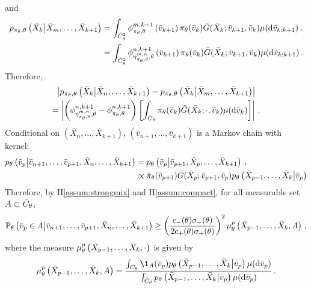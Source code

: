 and 
\begin{align*}
p_{\pi_{\theta},\theta}\left(\bar X_{k}\middle| \bar X_{m},\ldots,\bar X_{k+1}\right) &= \int_{\bar C_{\theta}^2}\phi^{m,k+1}_{\pi_{\theta},\theta}\left(\bar v_{k+1}\right)\pi_{\theta}(\bar v_{k})\bar G(\bar X_{k};\bar v_{k+1},\bar v_{k})\mu(\mathrm{d} \bar v_{k:k+1})\,,\\
&=\int_{\bar C_{\theta}^2}\phi^{n,k+1}_{\eta^{m,n}_{\pi_{\theta},\theta},\theta}\left(\bar v_{k+1}\right)\pi_{\theta}(\bar v_{k})\bar G(\bar X_{k};\bar v_{k+1},\bar v_{k})\mu(\mathrm{d} \bar v_{k:k+1})\,.
\end{align*}
Therefore,
\begin{multline}
\left|p_{\pi_{\theta},\theta}\left(\bar X_{k}\middle| \bar X_{n},\ldots,\bar X_{k+1}\right) - p_{\pi_{\theta},\theta}\left(\bar X_{k}\middle| \bar X_{m},\ldots,\bar X_{k+1}\right)\right|\\
= \left|\left(\phi^{n,k+1}_{\eta^{m,n}_{\pi_{\theta},\theta},\theta} - \phi^{n,k+1}_{\pi_{\theta},\theta}\right)\left[\int_{\bar C_{\theta}}\pi_{\theta}(\bar v_{k})\bar G(\bar X_{k};\cdot,\bar v_{k})\mu(\mathrm{d} \bar v_{k})\right]\right|\,.\label{eq:diff:likelihood}
\end{multline}
Conditional on $(\bar X_n,\ldots,\bar X_{k+1})$, $(\bar v_{n+1},\ldots,\bar v_{k+1})$ is a Markov chain with kernel:
\begin{align*}
p_{\theta}\left(\bar v_{p}\middle | \bar v_{n+1},\ldots, \bar v_{p+1},\bar X_n,\ldots,\bar X_{k+1}\right) &=  p_{\theta}\left(\bar v_{p}\middle |\bar v_{p+1},\bar X_p,\ldots,\bar X_{k+1}\right)\,,\\
&\propto \bar\pi_{\theta}(\bar v_{p+1}) \bar G(\bar X_{p};\bar v_{p+1},\bar v_{p})p_{\theta}\left(\bar X_{p-1},\ldots,\bar X_{k}\middle|\bar v_p\right)
\end{align*}
Therefore, by H\ref{assum:strongmix} and H\ref{assum:compact}, for all measurable set $A\subset \bar C_{\theta}$,
\[
\mathbb{P}_{\theta}\left(\bar v_{p}\in A\middle | \bar v_{n+1},\ldots, \bar v_{p+1},\bar X_n,\ldots,\bar X_{k+1}\right) \ge \left(\frac{c_-(\theta)\sigma_-(\theta)}{2c_+(\theta)\sigma_+(\theta)}\right)^2 \mu^p_{\theta}\left(\bar X_{p-1},\ldots,\bar X_{k},A\right)\,,
\]
where the measure $\mu^p_{\theta}\left(\bar X_{p-1},\ldots,\bar X_{k},\cdot\right)$ is given by
\[
\mu^p_{\param}\left(\bar X_{p-1},\ldots,\bar X_{k},A\right) = \frac{\int_{\bar C_{\param}} \1_{A}(\bar v_p)p_{\param}\left(\bar X_{p-1},\ldots,\bar X_{k}\middle|\bar v_p\right)\mu(\rmd \bar v_p)}{\int_{\bar C_{\param}} p_{\param}\left(\bar X_{p-1},\ldots,\bar X_{k}\middle|\bar v_p\right) \mu(\rmd \bar v_p)}\eqsp.
\]
